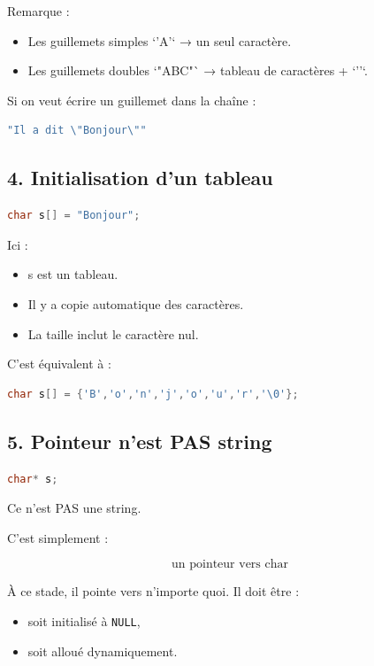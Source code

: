 Remarque :

\begin{itemize}
\item Les guillemets simples `'A'` → un seul caractère.
\item Les guillemets doubles `"ABC"` → tableau de caractères + `'\0'`.
\end{itemize}

Si on veut écrire un guillemet dans la chaîne :

\begin{lstlisting}[language=C]
"Il a dit \"Bonjour\""
\end{lstlisting}

\subsection{4. Initialisation d’un tableau}

\begin{lstlisting}[language=C]
char s[] = "Bonjour";
\end{lstlisting}

Ici :

\begin{itemize}
\item s est un tableau.
\item Il y a copie automatique des caractères.
\item La taille inclut le caractère nul.
\end{itemize}

C’est équivalent à :

\begin{lstlisting}[language=C]
char s[] = {'B','o','n','j','o','u','r','\0'};
\end{lstlisting}

\subsection{5. Pointeur n’est PAS string}

\begin{lstlisting}[language=C]
char* s;
\end{lstlisting}

Ce n’est PAS une string.

C’est simplement :

\[
\boxed{\text{un pointeur vers char}}
\]

À ce stade, il pointe vers n’importe quoi.
Il doit être :

\begin{itemize}
\item soit initialisé à \texttt{NULL},
\item soit alloué dynamiquement.
\end{itemize}

